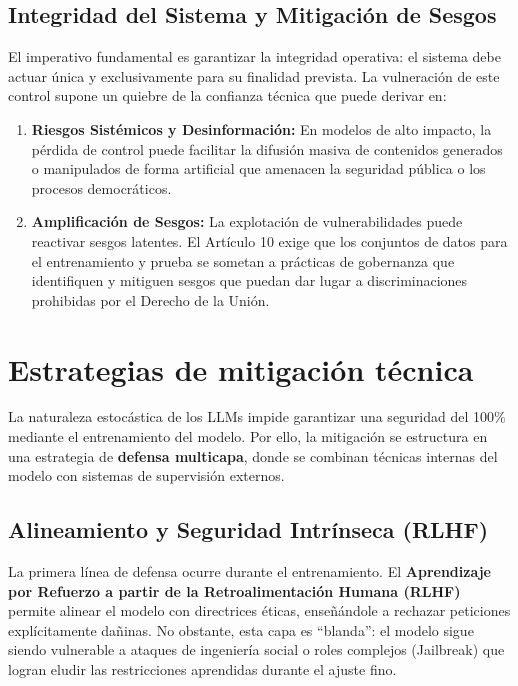 \documentclass[12pt]{article}
\begin{document}
\subsection{Integridad del Sistema y Mitigación de Sesgos}
El imperativo fundamental es garantizar la integridad operativa: el sistema debe actuar única y exclusivamente para su finalidad prevista. La vulneración de este control supone un quiebre de la confianza técnica que puede derivar en:
\begin{enumerate}
    \item \textbf{Riesgos Sistémicos y Desinformación:} En modelos de alto impacto, la pérdida de control puede facilitar la difusión masiva de contenidos generados o manipulados de forma artificial que amenacen la seguridad pública o los procesos democráticos.
    \item \textbf{Amplificación de Sesgos:} La explotación de vulnerabilidades puede reactivar sesgos latentes. El Artículo 10 exige que los conjuntos de datos para el entrenamiento y prueba se sometan a prácticas de gobernanza que identifiquen y mitiguen sesgos que puedan dar lugar a discriminaciones prohibidas por el Derecho de la Unión.
\end{enumerate}
\section{Estrategias de mitigación técnica}
La naturaleza estocástica de los LLMs impide garantizar una seguridad del 100\% mediante el entrenamiento del modelo. Por ello, la mitigación se estructura en una estrategia de \textbf{defensa multicapa}, donde se combinan técnicas internas del modelo con sistemas de supervisión externos.

\subsection{Alineamiento y Seguridad Intrínseca (RLHF)}
La primera línea de defensa ocurre durante el entrenamiento. El \textbf{Aprendizaje por Refuerzo a partir de la Retroalimentación Humana (RLHF)} permite alinear el modelo con directrices éticas, enseñándole a rechazar peticiones explícitamente dañinas. No obstante, esta capa es ``blanda'': el modelo sigue siendo vulnerable a ataques de ingeniería social o roles complejos (Jailbreak) que logran eludir las restricciones aprendidas durante el ajuste fino.
\end{document}
